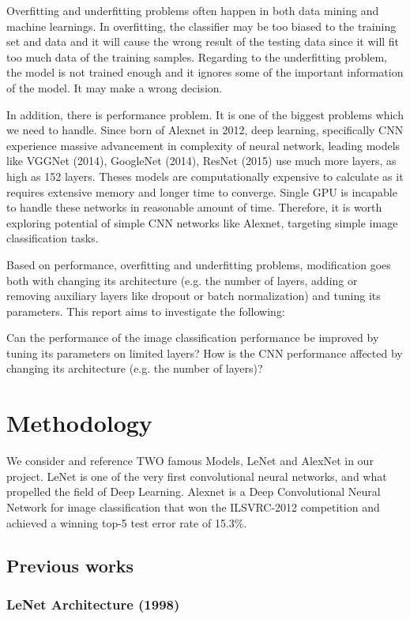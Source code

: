 \documentclass[journal,onecolumn]{IEEEtran}
\begin{document}
Overfitting and underfitting problems often happen in both data mining and machine learnings. In overfitting, the classifier may be too biased to the training set and data and it will cause the wrong result of the testing data since it will fit too much data of the training samples. Regarding to the underfitting problem, the model is not trained enough and it ignores some of the important information of the model. It may make a wrong decision.



In addition, there is performance problem. It is one of the biggest problems which we need to handle. Since born of Alexnet in 2012, deep learning, specifically CNN experience massive advancement in complexity of neural network, leading models like VGGNet (2014), GoogleNet (2014), ResNet (2015) use much more layers, as high as 152 layers. Theses models are computationally expensive to calculate as it requires extensive memory and longer time to converge. Single GPU is incapable to handle these networks in reasonable amount of time. Therefore, it is worth exploring potential of simple CNN networks like Alexnet, targeting simple image classification tasks. 

Based on performance, overfitting and underfitting problems, modification goes both with changing its architecture (e.g. the number of layers, adding or removing auxiliary layers like dropout or batch normalization) and tuning its parameters. This report aims to investigate the following:

Can the performance of the image classification performance be improved by tuning its parameters on limited layers?
How is the CNN performance affected by changing its architecture (e.g. the number of layers)?

\section{Methodology}
We consider and reference TWO famous Models, LeNet and AlexNet in our project. LeNet is one of the very first convolutional neural networks, and what propelled the field of Deep Learning. Alexnet is a Deep Convolutional Neural Network for image classification that won the ILSVRC-2012 competition and achieved a winning top-5 test error rate of 15.3\%. 

\subsection{Previous works}
\subsubsection{LeNet Architecture (1998)}
\end{document}

